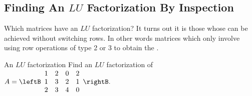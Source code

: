 \subsection{Finding An $LU$ Factorization By Inspection}

Which matrices have an $LU$ factorization? It turns out it is those whose
\ef\; can be achieved without switching rows. In other words matrices which
only involve using row operations of type 2 or 3 to obtain the \ef.

\begin{example}{An $LU$ factorization}{}
Find an $LU$ factorization of $A=\leftB
\begin{array}{cccc}
1 & 2 & 0 & 2 \\
1 & 3 & 2 & 1 \\
2 & 3 & 4 & 0%
\end{array}
\rightB .$
\end{example}

